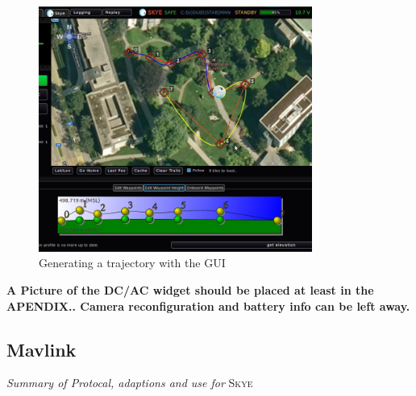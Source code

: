 \begin{figure}[H] %
	\begin{center}
		\includegraphics[width=0.8\textwidth]{qgc_automatic_control}
		\caption{Generating a trajectory with the GUI}
		\label{fig:qgc_automatic_control}		
	\end{center}
\end{figure}

\textbf{A Picture of the DC/AC widget should be placed at least in the APENDIX.. Camera reconfiguration and battery info can be left away.}

\subsection{Mavlink}
\textit{Summary of Protocal, adaptions and use for} \textsc{Skye}